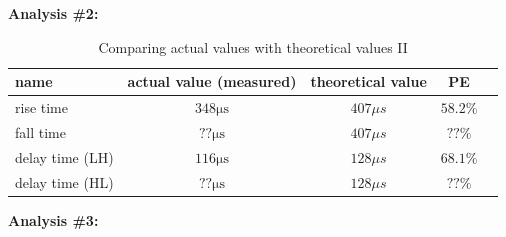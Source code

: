 \textbf{Analysis \#2:} \newline

\begin{table}[!htbp]
	\centering
	\caption{Comparing actual values with theoretical values II}
	\begin{tabular}{lcccl}
		\toprule
		name & actual value (measured) & theoretical value & PE & \\
		\midrule
		rise time & $348\mathrm{\mu s}$ & ${407\mu s}$ & $58.2\%$ & \\
		fall time & $??\mathrm{\mu s}$ &  ${407\mu s}$ & $??\%$ & \\
		delay time (LH) & $116\mathrm{\mu s}$ & ${128\mu s}$ & $68.1\%$ & \\
		delay time (HL) & $??\mathrm{\mu s}$ &  ${128\mu s}$ & $??\%$ & \\
		\bottomrule
	\end{tabular}
	\label{tab:dir}
\end{table}

\textbf{Analysis \#3:} \newline